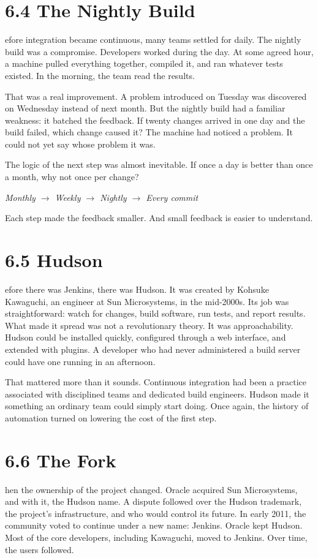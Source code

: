\documentclass[11pt, a4paper, openany]{book}
\newcommand{\initialcap}[1]{{\fontfamily{lmss}\selectfont\huge\textbf{#1}}}
\begin{document}
\section{6.4 The Nightly Build}
\noindent \initialcap{B}efore integration became continuous, many teams settled for daily. The nightly build was a compromise. Developers worked during the day. At some agreed hour, a machine pulled everything together, compiled it, and ran whatever tests existed. In the morning, the team read the results.

\noindent That was a real improvement. A problem introduced on Tuesday was discovered on Wednesday instead of next month. But the nightly build had a familiar weakness: it batched the feedback. If twenty changes arrived in one day and the build failed, which change caused it? The machine had noticed a problem. It could not yet say whose problem it was.

\noindent The logic of the next step was almost inevitable. If once a day is better than once a month, why not once per change?
\begin{center}
\textit{Monthly $\rightarrow$ Weekly $\rightarrow$ Nightly $\rightarrow$ Every commit}
\end{center}
Each step made the feedback smaller. And small feedback is easier to understand.

\section{6.5 Hudson}
\noindent \initialcap{B}efore there was Jenkins, there was Hudson. It was created by Kohsuke Kawaguchi, an engineer at Sun Microsystems, in the mid-2000s. Its job was straightforward: watch for changes, build software, run tests, and report results. What made it spread was not a revolutionary theory. It was approachability. Hudson could be installed quickly, configured through a web interface, and extended with plugins. A developer who had never administered a build server could have one running in an afternoon.

\noindent That mattered more than it sounds. Continuous integration had been a practice associated with disciplined teams and dedicated build engineers. Hudson made it something an ordinary team could simply start doing. Once again, the history of automation turned on lowering the cost of the first step.

\section{6.6 The Fork}
\noindent \initialcap{T}hen the ownership of the project changed. Oracle acquired Sun Microsystems, and with it, the Hudson name. A dispute followed over the Hudson trademark, the project's infrastructure, and who would control its future. In early 2011, the community voted to continue under a new name: Jenkins. Oracle kept Hudson. Most of the core developers, including Kawaguchi, moved to Jenkins. Over time, the users followed.
\end{document}
